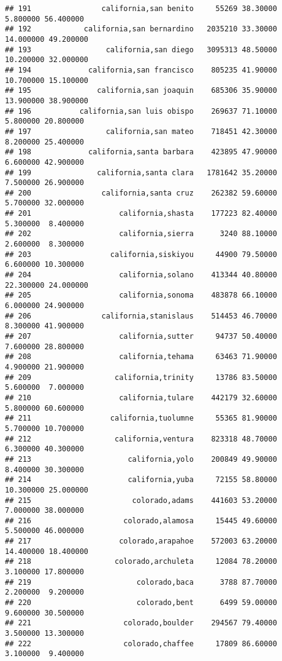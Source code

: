 \documentclass[
]{article}
\begin{document}
\begin{verbatim}
## 191                california,san benito     55269 38.30000  5.800000 56.400000
## 192            california,san bernardino   2035210 33.30000 14.000000 49.200000
## 193                 california,san diego   3095313 48.50000 10.200000 32.000000
## 194             california,san francisco    805235 41.90000 10.700000 15.100000
## 195               california,san joaquin    685306 35.90000 13.900000 38.900000
## 196           california,san luis obispo    269637 71.10000  5.800000 20.800000
## 197                 california,san mateo    718451 42.30000  8.200000 25.400000
## 198             california,santa barbara    423895 47.90000  6.600000 42.900000
## 199               california,santa clara   1781642 35.20000  7.500000 26.900000
## 200                california,santa cruz    262382 59.60000  5.700000 32.000000
## 201                    california,shasta    177223 82.40000  5.300000  8.400000
## 202                    california,sierra      3240 88.10000  2.600000  8.300000
## 203                  california,siskiyou     44900 79.50000  6.600000 10.300000
## 204                    california,solano    413344 40.80000 22.300000 24.000000
## 205                    california,sonoma    483878 66.10000  6.000000 24.900000
## 206                california,stanislaus    514453 46.70000  8.300000 41.900000
## 207                    california,sutter     94737 50.40000  7.600000 28.800000
## 208                    california,tehama     63463 71.90000  4.900000 21.900000
## 209                   california,trinity     13786 83.50000  5.600000  7.000000
## 210                    california,tulare    442179 32.60000  5.800000 60.600000
## 211                  california,tuolumne     55365 81.90000  5.700000 10.700000
## 212                   california,ventura    823318 48.70000  6.300000 40.300000
## 213                      california,yolo    200849 49.90000  8.400000 30.300000
## 214                      california,yuba     72155 58.80000 10.300000 25.000000
## 215                       colorado,adams    441603 53.20000  7.000000 38.000000
## 216                     colorado,alamosa     15445 49.60000  5.500000 46.000000
## 217                    colorado,arapahoe    572003 63.20000 14.400000 18.400000
## 218                   colorado,archuleta     12084 78.20000  3.100000 17.800000
## 219                        colorado,baca      3788 87.70000  2.200000  9.200000
## 220                        colorado,bent      6499 59.00000  9.600000 30.500000
## 221                     colorado,boulder    294567 79.40000  3.500000 13.300000
## 222                     colorado,chaffee     17809 86.60000  3.100000  9.400000

\end{verbatim}
\end{document}
